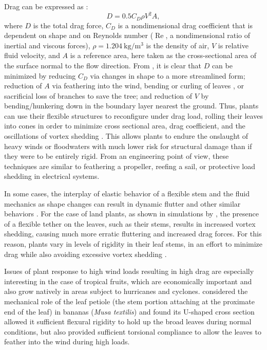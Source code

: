 Drag can be expressed as \citep{kundu2012fluid}:
\begin{equation}
D=0.5 C_D \rho V^2 A,
\label{eq:drag}
\end{equation}
where $D$ is the total drag force, $C_D$ is a nondimensional drag coefficient that is dependent on shape and on Reynolds number ($\operatorname{Re}$, a nondimensional ratio of inertial and viscous forces), $\rho=\SI{1.204}{\kilo\gram\per\meter\cubed}$ is the density of air, $V$ is relative fluid velocity, and $A$ is a reference area, here taken as the cross-sectional area of the surface normal to the flow direction. From , it is clear that $D$ can be minimized by reducing $C_D$ via changes in shape to a more streamlined form; reduction of $A$ via feathering into the wind, bending or curling of leaves \citep{ennos2000functional}, or sacrificial loss of branches to save the tree; and reduction of $V$ by bending/hunkering down in the boundary layer nearest the ground. Thus, plants can use their flexible structures to reconfigure under drag load, rolling their leaves into cones in order to minimize cross sectional area, drag coefficient, and the oscillations of vortex shedding \citep{miller2012reconfiguration, vogel1989drag, ennos2000functional}. This allows plants to endure the onslaught of heavy winds or floodwaters with much lower risk for structural damage than if they were to be entirely rigid. From an engineering point of view, these techniques are similar to feathering a propeller, reefing a sail, or protective load shedding in electrical systems.

In some cases, the interplay of elastic behavior of a flexible stem and the fluid mechanics as shape changes can result in dynamic flutter and other similar behaviors \citep{miller2012reconfiguration, boller2007interspecific, denny2002mechanics}. For the case of land plants, as shown in simulations by \citet{miller2012reconfiguration}, the presence of a flexible tether on the leaves, such as their stems, results in increased vortex shedding, causing much more erratic fluttering and increased drag forces. For this reason, plants vary in levels of rigidity in their leaf stems, in an effort to minimize drag while also avoiding excessive vortex shedding \citep{miller2012reconfiguration, vogel2009leaves}. 
    
Issues of plant response to high wind loads resulting in high drag are especially interesting in the case of tropical fruits, which are economically important and also grow natively in areas subject to hurricanes and cyclones. \citet{ennos2000functional} considered the mechanical role of the leaf petiole (the stem portion attaching at the proximate end of the leaf) in bananas (\emph{Musa textilis}) and found its U-shaped cross section allowed it sufficient flexural rigidity to hold up the broad leaves during normal conditions, but also provided sufficient torsional compliance to allow the leaves to feather into the wind during high loads. 
    
